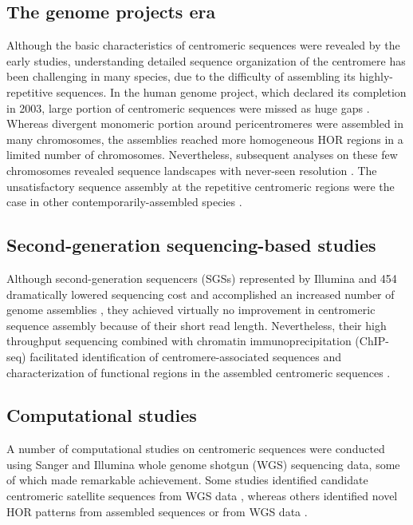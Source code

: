 \subsection*{The genome projects era}
  Although the basic characteristics of centromeric sequences were revealed by the early studies, understanding detailed sequence organization of the centromere has been challenging in many species, due to the difficulty of assembling its highly-repetitive sequences. In the human genome project, which declared its completion in 2003, large portion of centromeric sequences were missed as huge gaps \cite{M.KatharineRuddand2004, She2004}. Whereas divergent monomeric portion around pericentromeres were assembled in many chromosomes, the assemblies reached more homogeneous HOR regions in a limited number of chromosomes. Nevertheless, subsequent analyses on these few chromosomes revealed sequence landscapes with never-seen resolution \cite{Schueler2001, Ross2005, Nusbaum2006, Rudd2006}. The unsatisfactory sequence assembly at the repetitive centromeric regions were the case in other contemporarily-assembled species \cite {Waterston2002, Hoskins2007}.


\subsection*{Second-generation sequencing-based studies}
  Although second-generation sequencers (SGSs) represented by Illumina and 454 dramatically lowered sequencing cost and accomplished an increased number of genome assemblies \cite{Schatz2010}, they achieved virtually no improvement in centromeric sequence assembly because of their short read length. Nevertheless, their high throughput sequencing combined with chromatin immunoprecipitation (ChIP-seq) facilitated identification of centromere-associated sequences and characterization of functional regions in the assembled centromeric sequences \cite{Hayden2013}.


\subsection*{Computational studies}
  A number of computational studies on centromeric sequences were conducted using Sanger and Illumina whole genome shotgun (WGS) sequencing data, some of which made remarkable achievement. Some studies identified candidate centromeric satellite sequences from WGS data \cite{Alkan2011, Melters2013}, whereas others identified novel HOR patterns from assembled sequences \cite{Rosandic2003} or from WGS data \cite{Alkan2007}.

